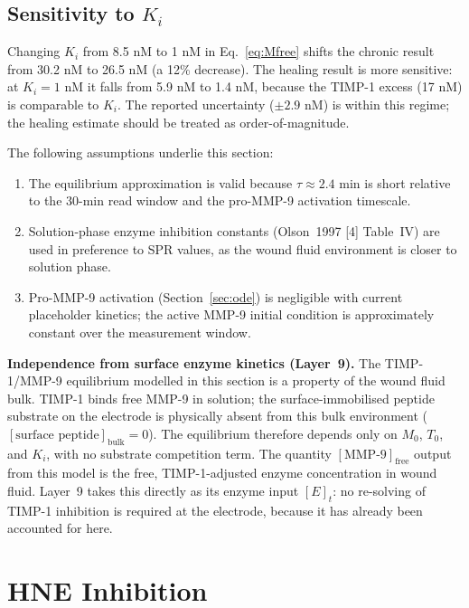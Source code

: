 \documentclass[10pt,a4paper]{article}
\numberwithin{equation}{section}
\newcommand{\cit}[1]{[#1]}   %
\begin{document}
\subsection{Sensitivity to $K_i$}

Changing $K_i$ from 8.5 nM to 1 nM in Eq.~\eqref{eq:Mfree} shifts the chronic
result from 30.2 nM to 26.5 nM (a 12\% decrease). The healing result is more
sensitive: at $K_i = 1$ nM it falls from 5.9 nM to 1.4 nM, because the TIMP-1
excess (17 nM) is comparable to $K_i$. The reported uncertainty ($\pm 2.9$ nM) is
within this regime; the healing estimate should be treated as order-of-magnitude.

The following assumptions underlie this section:

\begin{enumerate}[noitemsep]
  \item The equilibrium approximation is valid because $\tau \approx 2.4$ min is
    short relative to the 30-min read window and the pro-MMP-9 activation timescale.
  \item Solution-phase enzyme inhibition constants (Olson~1997 \cit{4} Table~IV)
    are used in preference to SPR values, as the wound fluid environment is closer to
    solution phase.
  \item Pro-MMP-9 activation (Section~\ref{sec:ode}) is negligible with current
    placeholder kinetics; the active MMP-9 initial condition is approximately constant
    over the measurement window.
\end{enumerate}

\textbf{Independence from surface enzyme kinetics (Layer~9).}
The TIMP-1/MMP-9 equilibrium modelled in this section is a property of the wound fluid
bulk. TIMP-1 binds free MMP-9 in solution; the surface-immobilised peptide substrate on
the electrode is physically absent from this bulk environment ($[\text{surface peptide}]_{\text{bulk}} = 0$).
The equilibrium therefore depends only on $M_0$, $T_0$, and $K_i$, with no substrate
competition term. The quantity $[\text{MMP-9}]_{\text{free}}$ output from this model is
the free, TIMP-1-adjusted enzyme concentration in wound fluid. Layer~9 takes this directly
as its enzyme input $[E]_t$: no re-solving of TIMP-1 inhibition is required at the
electrode, because it has already been accounted for here.

\section{HNE Inhibition}
\label{sec:hne}
\end{document}

